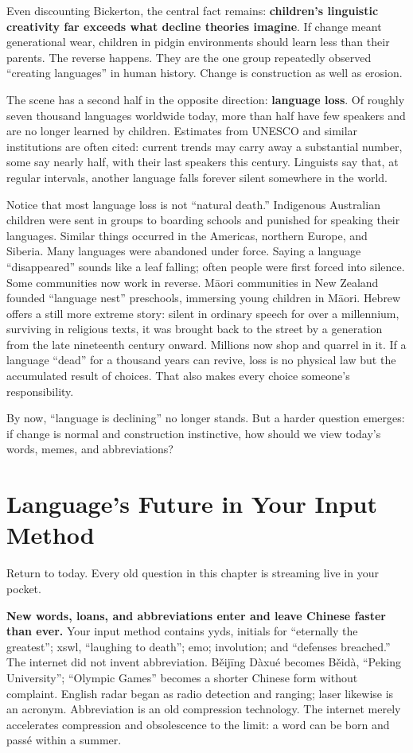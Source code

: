 Even discounting Bickerton, the central fact remains: \textbf{children's linguistic creativity far exceeds what decline theories imagine}. If change meant generational wear, children in pidgin environments should learn less than their parents. The reverse happens. They are the one group repeatedly observed ``creating languages'' in human history. Change is construction as well as erosion.

The scene has a second half in the opposite direction: \textbf{language loss}. Of roughly seven thousand languages worldwide today, more than half have few speakers and are no longer learned by children. Estimates from UNESCO and similar institutions are often cited: current trends may carry away a substantial number, some say nearly half, with their last speakers this century. Linguists say that, at regular intervals, another language falls forever silent somewhere in the world.

Notice that most language loss is not ``natural death.'' Indigenous Australian children were sent in groups to boarding schools and punished for speaking their languages. Similar things occurred in the Americas, northern Europe, and Siberia. Many languages were abandoned under force. Saying a language ``disappeared'' sounds like a leaf falling; often people were first forced into silence. Some communities now work in reverse. Māori communities in New Zealand founded ``language nest'' preschools, immersing young children in Māori. Hebrew offers a still more extreme story: silent in ordinary speech for over a millennium, surviving in religious texts, it was brought back to the street by a generation from the late nineteenth century onward. Millions now shop and quarrel in it. If a language ``dead'' for a thousand years can revive, loss is no physical law but the accumulated result of choices. That also makes every choice someone's responsibility.

By now, ``language is declining'' no longer stands. But a harder question emerges: if change is normal and construction instinctive, how should we view today's words, memes, and abbreviations?

\section{Language's Future in Your Input Method}
Return to today. Every old question in this chapter is streaming live in your pocket.

\textbf{New words, loans, and abbreviations enter and leave Chinese faster than ever.} Your input method contains yyds, initials for ``eternally the greatest''; xswl, ``laughing to death''; emo; involution; and ``defenses breached.'' The internet did not invent abbreviation. Běijīng Dàxué becomes Běidà, ``Peking University''; ``Olympic Games'' becomes a shorter Chinese form without complaint. English radar began as radio detection and ranging; laser likewise is an acronym. Abbreviation is an old compression technology. The internet merely accelerates compression and obsolescence to the limit: a word can be born and passé within a summer.

